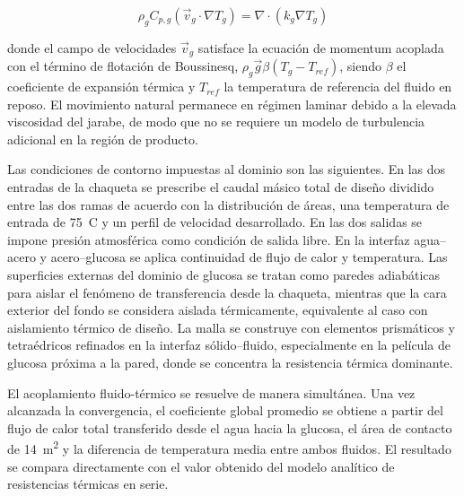 \begin{equation}
\rho_g C_{p,g} \left( \vec{v}_g \cdot \nabla T_g \right) = \nabla \cdot (k_g \nabla T_g)
\label{eq:energia_glucosa_cfd}
\end{equation}

donde el campo de velocidades $\vec{v}_g$ satisface la ecuaci\'on de momentum acoplada con el t\'ermino de flotaci\'on de Boussinesq, $\rho_g \vec{g} \beta (T_g - T_{ref})$, siendo $\beta$ el coeficiente de expansi\'on t\'ermica y $T_{ref}$ la temperatura de referencia del fluido en reposo. El movimiento natural permanece en r\'egimen laminar debido a la elevada viscosidad del jarabe, de modo que no se requiere un modelo de turbulencia adicional en la regi\'on de producto.

Las condiciones de contorno impuestas al dominio son las siguientes. En las dos entradas de la chaqueta se prescribe el caudal m\'asico total de dise\~no dividido entre las dos ramas de acuerdo con la distribuci\'on de \'areas, una temperatura de entrada de 75~\textdegree C y un perfil de velocidad desarrollado. En las dos salidas se impone presi\'on atmosf\'erica como condici\'on de salida libre. En la interfaz agua--acero y acero--glucosa se aplica continuidad de flujo de calor y temperatura. Las superficies externas del dominio de glucosa se tratan como paredes adiab\'aticas para aislar el fen\'omeno de transferencia desde la chaqueta, mientras que la cara exterior del fondo se considera aislada t\'ermicamente, equivalente al caso con aislamiento t\'ermico de dise\~no. La malla se construye con elementos prism\'aticos y tetra\'edricos refinados en la interfaz s\'olido--fluido, especialmente en la pel\'icula de glucosa pr\'oxima a la pared, donde se concentra la resistencia t\'ermica dominante.

El acoplamiento fluido-t\'ermico se resuelve de manera simult\'anea. Una vez alcanzada la convergencia, el coeficiente global promedio se obtiene a partir del flujo de calor total transferido desde el agua hacia la glucosa, el \'area de contacto de 14~m\textsuperscript{2} y la diferencia de temperatura media entre ambos fluidos. El resultado se compara directamente con el valor obtenido del modelo anal\'itico de resistencias t\'ermicas en serie.
